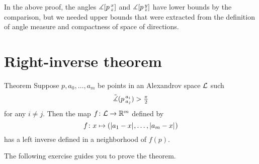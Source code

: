 In the above proof, the angles $\measuredangle[p\,{}^{x}_{z}]$ and $\measuredangle[p\,{}^{y}_{z}]$ have lower bounds by 
the comparison, but we needed upper bounds that were extracted from the definition of angle measure and compactness of space of directions.

\section{Right-inverse theorem}

\begin{thm}{Theorem}\label{thm:right-inverse}
Suppose $p,a_0,\dots,a_m$ be points in an Alexandrov space $\mathcal{L}$ such
\[\tilde\measuredangle(p\,{}^{a_i}_{a_j})>\tfrac\pi2\]
for any $i\ne j$.
Then the map $f\colon\mathcal{L}\to\mathbb{R}^m$ defined by
\[f\:x\mapsto (\dist{a_1}{x}{},\dots,\dist{a_m}{x}{})\]
has a left inverse defined in a neighborhood of $f(p)$.
\end{thm}

The following exercise guides you to prove the theorem.

